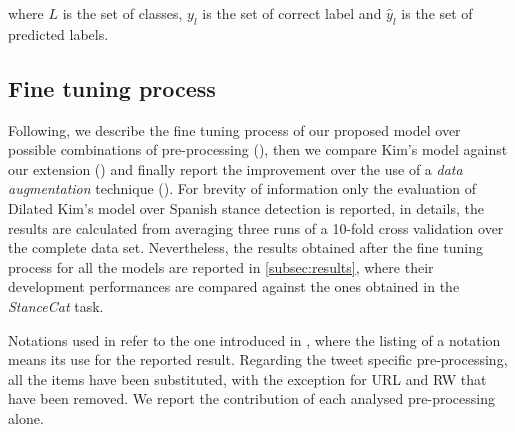 \noindent where $L$ is the set of classes, $y_l$ is the set of correct label and $\hat{y}_l$ is the set of predicted labels.


\subsection{Fine tuning process} \label{subsec:tuning}

Following, we describe the fine tuning process of our proposed model over possible combinations of pre-processing (), then we compare Kim's model against our extension () and finally report the improvement over the use of a \emph{data augmentation} technique ().
For brevity of information only the evaluation of Dilated Kim's model over Spanish stance detection is reported, in details, the results are calculated from averaging three runs of a 10-fold cross validation over the complete data set.
Nevertheless, the results obtained after the fine tuning process for all the models are reported in \cref{subsec:results}, where their development performances are compared against the ones obtained in the \emph{StanceCat} task.

Notations used in  refer to the one introduced in , where the listing of a notation means its use for the reported result. 
Regarding the tweet specific pre-processing, all the items have been substituted, with the exception for URL and RW that have been removed. We report the contribution of each analysed pre-processing alone.

\begin{comment}

\begin{table}[t]
\footnotesize
\caption{Pre-processing fine tuning for the Dilated Kim's model from a three run of 10-fold cross validation over the development set. Results are in terms of average $F_{1-macro}$ score. The processing technique that brought a model's improvement has its result in bold.}
\label{tab:preprocessingOLD}
\centering
\begin{tabular}{l|cccccccccc}
\toprule
\hline
\multirow{2}{*}{Models}		& \multicolumn{10}{ c }{Pre-processing}       \\ 
		& Nothing	& ST	& SW	& URL	& RW	& MT	& HT	& NUM	& EM	& SM	\\
\hline
Dilated Kim		& 0.606		& \textbf{0.615}	& 0.590	&  0.585	& 0.578	&  \textbf{0.610}	& 0.543	&  0.570	& 0.564	& 0.585	\\
\hline
\bottomrule
\end{tabular}
\end{table}
\end{comment}


